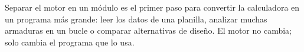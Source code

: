 \begin{parasabermas}
Separar el motor en un módulo es el primer paso para convertir la calculadora
en un programa más grande: leer los datos de una planilla, analizar muchas
armaduras en un bucle o comparar alternativas de diseño. El motor no cambia;
solo cambia el programa que lo usa.
\end{parasabermas}
